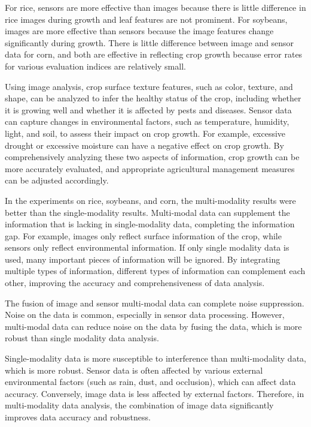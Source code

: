 \documentclass[acmsmall,manuscript, screen, review]{acmart}
\begin{document}
For rice, sensors are more effective than images because there is little difference in rice images during growth and leaf features are not prominent. For soybeans, images are more effective than sensors because the image features change significantly during growth. There is little difference between image and sensor data for corn, and both are effective in reflecting crop growth because error rates for various evaluation indices are relatively small. 

Using image analysis, crop surface texture features, such as color, texture, and shape, can be analyzed to infer the healthy status of the crop, including whether it is growing well and whether it is affected by pests and diseases. Sensor data can capture changes in environmental factors, such as temperature, humidity, light, and soil, to assess their impact on crop growth. For example, excessive drought or excessive moisture can have a negative effect on crop growth. By comprehensively analyzing these two aspects of information, crop growth can be more accurately evaluated, and appropriate agricultural management measures can be adjusted accordingly. 

In the experiments on rice, soybeans, and corn, the multi-modality results were better than the single-modality results. Multi-modal data can supplement the information that is lacking in single-modality data, completing the information gap. For example, images only reflect surface information of the crop, while sensors only reflect environmental information. If only single modality data is used, many important pieces of information will be ignored. By integrating multiple types of information, different types of information can complement each other, improving the accuracy and comprehensiveness of data analysis. 

The fusion of image and sensor multi-modal data can complete noise suppression. Noise on the data is common, especially in sensor data processing. However, multi-modal data can reduce noise on the data by fusing the data, which is more robust than single modality data analysis. 

Single-modality data is more susceptible to interference than multi-modality data, which is more robust. Sensor data is often affected by various external environmental factors (such as rain, dust, and occlusion), which can affect data accuracy. Conversely, image data is less affected by external factors. Therefore, in multi-modality data analysis, the combination of image data significantly improves data accuracy and robustness. 
\end{document}
